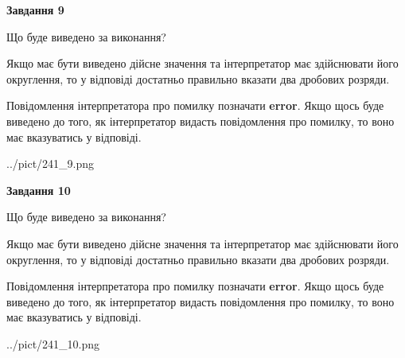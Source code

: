 \documentclass[12pt, ukrainian]{article}
\begin{document}
{\begin {Large}
{\begin {center}\textbf{Завдання 9}\end {center}}\par
Що буде виведено за виконання? \par

Якщо має бути виведено дійсне значення та інтерпретатор має здійснювати його округлення, 
то у відповіді достатньо правильно вказати два дробових розряди.

Повідомлення інтерпретатора про помилку позначати \textbf{error}.
Якщо щось буде виведено до того, як інтерпретатор видасть повідомлення про помилку, 
то воно має вказуватись у відповіді. \par

\begin{center}
	{../pict/241_9.png}
\end{center}
\newpage

{\begin {center}\textbf{Завдання 10}\end {center}}\par
Що буде виведено за виконання? \par

Якщо має бути виведено дійсне значення та інтерпретатор має здійснювати його округлення, 
то у відповіді достатньо правильно вказати два дробових розряди.

Повідомлення інтерпретатора про помилку позначати \textbf{error}.
Якщо щось буде виведено до того, як інтерпретатор видасть повідомлення про помилку, 
то воно має вказуватись у відповіді. \par

\begin{center}
	{../pict/241_10.png}
\end{center}
\newpage

\end {Large}}
\end{document}
